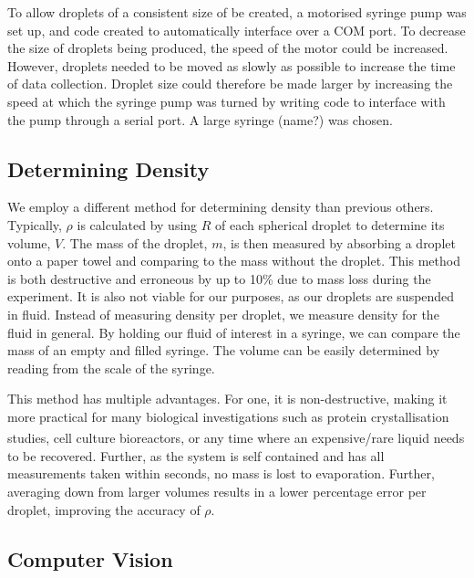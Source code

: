 \documentclass{physics_article_B}
\begin{document}
        To allow droplets of a consistent size of be created, a motorised syringe pump was set up, and code created to automatically interface over a COM port. To decrease the size of droplets being produced, the speed of the motor could be increased. However, droplets needed to be moved as slowly as possible to increase the time of data collection. Droplet size could therefore be made larger by increasing the speed at which the syringe pump was turned by writing code to interface with the pump through a serial port. A large syringe (name?) was chosen.
        
        
    \subsection{Determining Density\label{sect:method:density}}
    
        We employ a different method for determining density than previous others. Typically, $\rho$ is calculated by using $R$ of each spherical droplet to determine its volume, $V$. The mass of the droplet, $m$, is then measured by absorbing a droplet onto a paper towel and comparing to the mass without the droplet\cite{hill}. This method is both destructive and erroneous by up to 10\%\cite{harrold2} due to mass loss during the experiment. It is also not viable for our purposes, as our droplets are suspended in fluid. 
        Instead of measuring density per droplet, we measure density for the fluid in general. By holding our fluid of interest in a syringe, we can compare the mass of an empty and filled syringe. The volume can be easily determined by reading from the scale of the syringe.
    
        This method has multiple advantages. For one, it is non-destructive, making it more practical for many biological investigations such as protein crystallisation  studies\textsuperscript{\cite{zhu}}, cell culture bioreactors\textsuperscript{\cite{konry}}, or any time where an expensive/rare liquid needs to be recovered\cite{Backholm2017}. Further, as the system is self contained and has all measurements taken within seconds, no mass is lost to evaporation. Further, averaging down from larger volumes results in a lower percentage error per droplet, improving the accuracy of $\rho$.
        
    \subsection{Computer Vision\label{sect:method:vision}}
        
\end{document}
